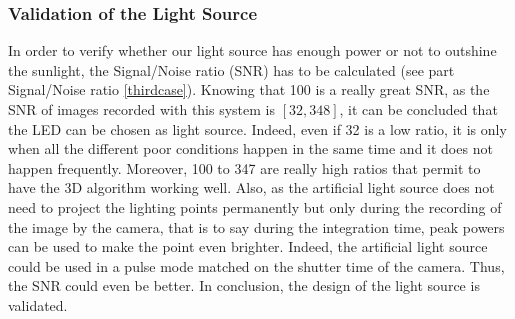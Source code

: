 \subsubsection{Validation of the Light Source}
\label{light Power}
In order to verify whether our light source has enough power or not to outshine the sunlight, the Signal/Noise ratio (SNR) has to be calculated (see part Signal/Noise ratio \ref{thirdcase}). Knowing that 100 is a really great SNR, as the SNR of images recorded with this system is $[32, 348]$, it can be concluded that the LED can be chosen as light source. Indeed, even if 32 is a low ratio, it is only when all the different poor conditions happen in the same time and it does not happen frequently. Moreover, 100 to 347 are really high ratios that permit to have the 3D algorithm working well. Also, as the artificial light source does not need to project the lighting points permanently but only during the recording of the image by the camera, that is to say during the integration time, peak powers can be used to make the point even brighter. Indeed, the artificial light source could be used in a pulse mode matched on the shutter time of the camera. Thus, the SNR could even be better. In conclusion, the design of the light source is validated.




